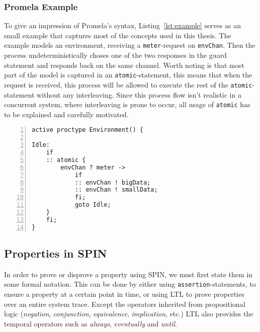 
\subsubsection{Promela Example}

To give an impression of Promela's syntax, Listing~\ref{lst:example} serves as an small example that captures most of the concepts used in this thesis. The example models an environment, receiving a \texttt{meter}-request on \texttt{envChan}. Then the process undeterministically choses one of the two responses in the guard statement and responds back on the same channel. Worth noting is that most part of the model is captured in an \texttt{atomic}-statement, this means that when the request is received, this process will be allowed to execute the rest of the \texttt{atomic}-statement without any interleaving. 
Since this process flow isn't realistic in a concurrent system, where interleaving is prone to occur, all usage of \texttt{atomic} has to be explained and carefully motivated. 

\begin{lstlisting}[caption={Promela Example},label={lst:example},language=Promela, numbers=left, basicstyle=\footnotesize, tabsize=2]
active proctype Environment() {

Idle:  
	if
	:: atomic { 
		envChan ? meter ->  
			if
			:: envChan ! bigData;
			:: envChan ! smallData;
			fi; 
			goto Idle;
	}
	fi;
}
\end{lstlisting}

\subsection{Properties in SPIN}


In order to prove or disprove a property using SPIN, we must first state them in some formal notation. This can be done by either using \texttt{assertion}-statements, to ensure a property at a certain point in time, or using LTL to prove properties over an entire system trace. 
Except the operators inherited from propositional logic (\textit{negation}, \textit{conjunction}, \textit{equivalence}, \textit{implication}, etc.) LTL also provides the temporal operators such as \textit{always}, \textit{eventually} and \textit{until}.  

